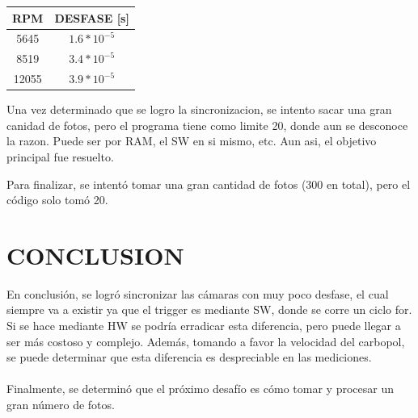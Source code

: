 \documentclass{article}
\begin{document}
\begin{center}
    \begin{tabular}{|c|c|}
    \hline
    RPM & DESFASE [s] \\
    \hline
    5645 & $1.6*10^{-5}$ \\
    \hline
    8519 & $3.4*10^{-5}$ \\
    \hline
    12055 & $3.9*10^{-5}$ \\
    \hline
    \end{tabular}
\end{center}

Una vez determinado que se logro la sincronizacion, se intento sacar una gran canidad de fotos,
pero el programa tiene como limite 20, donde aun se desconoce la razon. Puede ser por RAM, el SW en si mismo, etc. Aun 
asi, el objetivo principal fue resuelto.

\noindent Para finalizar, se intentó tomar una gran cantidad de fotos (300 en total), pero el código solo tomó 20.

\section{CONCLUSION}
\noindent En conclusión, se logró sincronizar las cámaras con muy poco desfase, el cual siempre va a existir ya que el trigger es mediante SW, donde se corre un ciclo for. Si se hace mediante HW se podría erradicar esta diferencia, pero puede llegar a ser más costoso y complejo. Además, tomando a favor la velocidad del carbopol, se puede determinar que esta diferencia es despreciable en las mediciones.
\\ \\
Finalmente, se determinó que el próximo desafío es cómo tomar y procesar un gran número de fotos.
\end{document}
